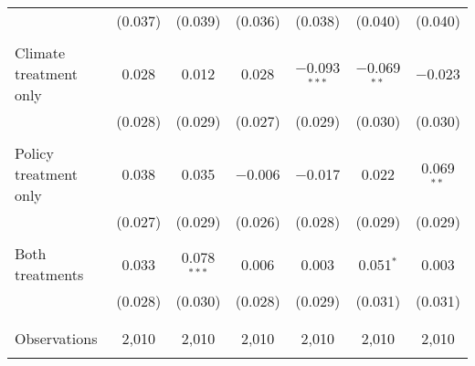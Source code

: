 \begin{tabular}{@{\extracolsep{5pt}}lcccccc}
  & (0.037) & (0.039) & (0.036) & (0.038) & (0.040) & (0.040) \\ 
  & & & & & & \\ 
 Climate treatment only & 0.028 & 0.012 & 0.028 & $-$0.093$^{***}$ & $-$0.069$^{**}$ & $-$0.023 \\ 
  & (0.028) & (0.029) & (0.027) & (0.029) & (0.030) & (0.030) \\ 
  & & & & & & \\ 
 Policy treatment only & 0.038 & 0.035 & $-$0.006 & $-$0.017 & 0.022 & 0.069$^{**}$ \\ 
  & (0.027) & (0.029) & (0.026) & (0.028) & (0.029) & (0.029) \\ 
  & & & & & & \\ 
 Both treatments & 0.033 & 0.078$^{***}$ & 0.006 & 0.003 & 0.051$^{*}$ & 0.003 \\ 
  & (0.028) & (0.030) & (0.028) & (0.029) & (0.031) & (0.031) \\ 
  & & & & & & \\ 
\hline \\[-1.8ex] 

Observations & 2,010 & 2,010 & 2,010 & 2,010 & 2,010 & 2,010 \\ 
\hline 
\hline \\[-1.8ex] 
\end{tabular} 